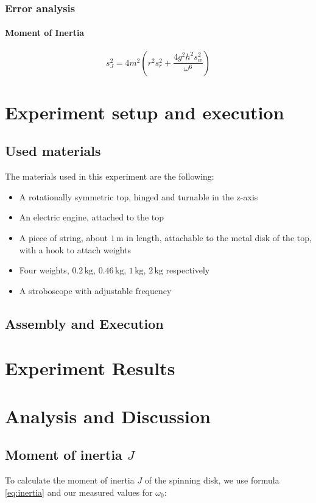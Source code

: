 \documentclass{scrreprt}
\newcommand{\unit}[1]{\ensuremath{\, \mathrm{#1}}}
\begin{document}
\subsubsection{Error analysis}
\paragraph*{Moment of Inertia}

\begin{equation}
s_J^2 = 4 m^2 \left( r^2 s_r^2 + \frac{4 g^2 h^2 s_w^2}{\omega^6} \right)
\end{equation}

\section{Experiment setup and execution}

\subsection{Used materials}
The materials used in this experiment are the following:
\begin{itemize}
\item A rotationally symmetric top, hinged and turnable in the z-axis
\item An electric engine, attached to the top
\item A piece of string, about $1 \unit{m}$ in length, attachable to the metal disk of the top, with a hook to attach weights
\item Four weights, $0.2 \unit{kg}$, $0.46 \unit{kg}$, $1 \unit{kg}$, $2 \unit{kg}$ respectively
\item A stroboscope with adjustable frequency
\end{itemize}

\subsection{Assembly and Execution}

\section{Experiment Results}

\section{Analysis and Discussion}

\subsection{Moment of inertia $J$}
To calculate the moment of inertia $J$ of the spinning disk, we use formula \ref{eq:inertia} and our measured values for $\omega_0$:
\end{document}
